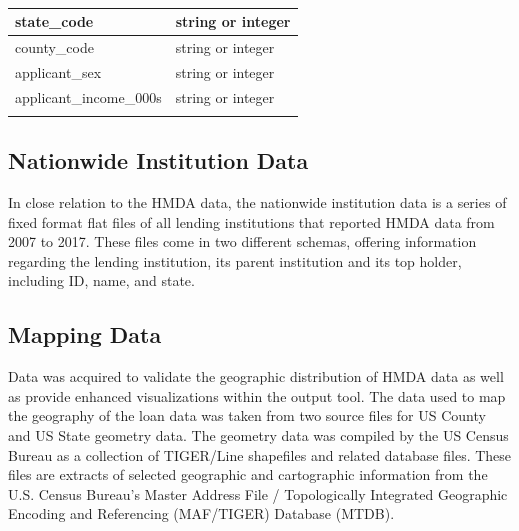 \documentclass[conference,compsoc]{IEEEtran}
\begin{document}
\begin{table}[h!]
\begin{tabular}{ll}
\multicolumn{1}{|l|}{state\_code}                 & \multicolumn{1}{l|}{string or integer}                                                                         \\ \hline
\multicolumn{1}{|l|}{county\_code}                & \multicolumn{1}{l|}{string or integer}                                                                         \\ \hline
\multicolumn{1}{|l|}{applicant\_sex}              & \multicolumn{1}{l|}{string or integer}                                                                         \\ \hline
\multicolumn{1}{|l|}{applicant\_income\_000s}     & \multicolumn{1}{l|}{string or integer}                                                                         \\ \hline
                                                  &                                                                                                               
\end{tabular}
\caption{}
\label{tab:my-table}
\end{table}

\subsection{Nationwide Institution Data}
In close relation to the HMDA data, the nationwide institution data is a series of fixed format flat files of all lending institutions that reported HMDA data from 2007 to 2017. These files come in two different schemas, offering information regarding the lending institution, its parent institution and its top holder, including ID, name, and state. 

\subsection{Mapping Data}

Data was acquired to validate the geographic distribution of HMDA data as well as provide enhanced visualizations within the output tool. The data used to map the geography of the loan data was taken from two source files for US County \cite{USCensusOne} and US State \cite{USCensusTwo} geometry data. The geometry data was compiled by the US Census Bureau as a collection of TIGER/Line shapefiles and related database files. These files are extracts of selected geographic and cartographic information from the U.S. Census Bureau's Master Address File / Topologically Integrated Geographic Encoding and Referencing (MAF/TIGER) Database (MTDB). 
\end{document}
